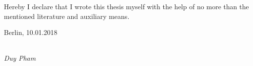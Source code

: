 \newpage

\thispagestyle{empty}

\begin{large}

\vspace*{6cm}

\noindent
Hereby I declare that I wrote this thesis myself with the help of no more than the mentioned literature and auxiliary means.
\vspace{2cm}

\noindent
Berlin, 10.01.2018

\vspace{3cm}

\hspace*{7cm}%
\dotfill\\
\hspace*{8.5cm}%
\textit{Duy Pham}

\end{large}
